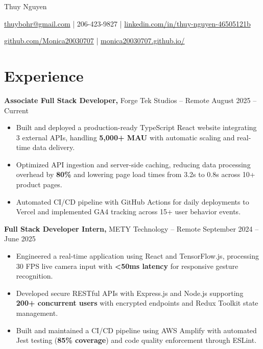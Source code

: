 \documentclass[11pt]{article}
\begin{document}
\centerline{\Huge Thuy Nguyen}

\vspace{5pt}

\centerline{\href{mailto:thuybohr@gmail.com}{thuybohr@gmail.com} | 206-423-9827 |
\href{https://www.linkedin.com/in/thuy-nguyen-46505121b/}{linkedin.com/in/thuy-nguyen-46505121b}}

\centerline{\href{https://github.com/Monica20030707}{github.com/Monica20030707} |
\href{https://monica20030707.github.io/}{monica20030707.github.io/}}

\vspace{-9pt}

\section*{Experience}

\textbf{Associate Full Stack Developer,} {Forge Tek Studios} -- Remote \hfill August 2025 -- Current
\vspace{-9pt}
\begin{itemize}
  \item Built and deployed a production-ready TypeScript React website integrating 3 external APIs, handling \textbf{5,000+ MAU} with automatic scaling and real-time data delivery.
  \item Optimized API ingestion and server-side caching, reducing data processing overhead by \textbf{80\%} and lowering page load times from 3.2s to 0.8s across 10+ product pages.
  \item Automated CI/CD pipeline with GitHub Actions for daily deployments to Vercel and implemented GA4 tracking across 15+ user behavior events.
\end{itemize}

\textbf{Full Stack Developer Intern,} {METY Technology} -- Remote \hfill September 2024 -- June 2025
\vspace{-9pt}
\begin{itemize}
  \item Engineered a real-time application using React and TensorFlow.js, processing 30 FPS live camera input with \textbf{<50ms latency} for responsive gesture recognition.
  \item Developed secure RESTful APIs with Express.js and Node.js supporting \textbf{200+ concurrent users} with encrypted endpoints and Redux Toolkit state management.
  \item Built and maintained a CI/CD pipeline using AWS Amplify with automated Jest testing (\textbf{85\% coverage}) and code quality enforcement through ESLint.
\end{itemize}
\end{document}
